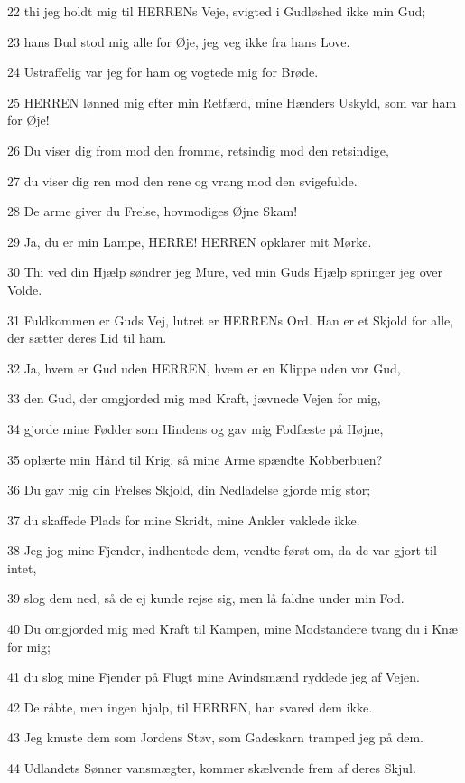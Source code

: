\par 22 thi jeg holdt mig til HERRENs Veje, svigted i Gudløshed ikke min Gud;
\par 23 hans Bud stod mig alle for Øje, jeg veg ikke fra hans Love.
\par 24 Ustraffelig var jeg for ham og vogtede mig for Brøde.
\par 25 HERREN lønned mig efter min Retfærd, mine Hænders Uskyld, som var ham for Øje!
\par 26 Du viser dig from mod den fromme, retsindig mod den retsindige,
\par 27 du viser dig ren mod den rene og vrang mod den svigefulde.
\par 28 De arme giver du Frelse, hovmodiges Øjne Skam!
\par 29 Ja, du er min Lampe, HERRE! HERREN opklarer mit Mørke.
\par 30 Thi ved din Hjælp søndrer jeg Mure, ved min Guds Hjælp springer jeg over Volde.
\par 31 Fuldkommen er Guds Vej, lutret er HERRENs Ord. Han er et Skjold for alle, der sætter deres Lid til ham.
\par 32 Ja, hvem er Gud uden HERREN, hvem er en Klippe uden vor Gud,
\par 33 den Gud, der omgjorded mig med Kraft, jævnede Vejen for mig,
\par 34 gjorde mine Fødder som Hindens og gav mig Fodfæste på Højne,
\par 35 oplærte min Hånd til Krig, så mine Arme spændte Kobberbuen?
\par 36 Du gav mig din Frelses Skjold, din Nedladelse gjorde mig stor;
\par 37 du skaffede Plads for mine Skridt, mine Ankler vaklede ikke.
\par 38 Jeg jog mine Fjender, indhentede dem, vendte først om, da de var gjort til intet,
\par 39 slog dem ned, så de ej kunde rejse sig, men lå faldne under min Fod.
\par 40 Du omgjorded mig med Kraft til Kampen, mine Modstandere tvang du i Knæ for mig;
\par 41 du slog mine Fjender på Flugt mine Avindsmænd ryddede jeg af Vejen.
\par 42 De råbte, men ingen hjalp, til HERREN, han svared dem ikke.
\par 43 Jeg knuste dem som Jordens Støv, som Gadeskarn tramped jeg på dem.
\par 44 Udlandets Sønner vansmægter, kommer skælvende frem af deres Skjul.

